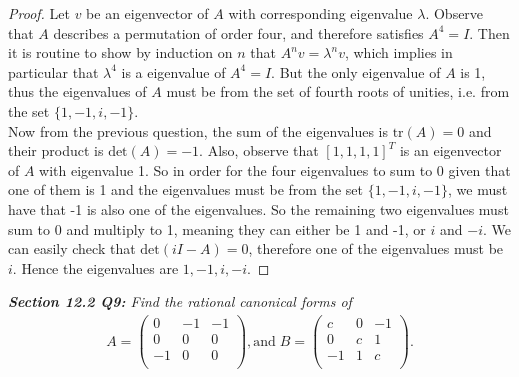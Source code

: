 \documentclass{article}
\begin{document}
  \begin{proof}
    Let $v$ be an eigenvector of $A$ with corresponding eigenvalue
    $\lambda$. Observe that $A$ describes a permutation of order four, and
    therefore satisfies $A^4=I$. Then it is routine to show by induction on
    $n$ that $A^nv=\lambda^nv$, which implies in particular that
    $\lambda^4$ is a eigenvalue of $A^4=I$. But the only eigenvalue of $A$
    is 1, thus the eigenvalues of $A$ must be from the set of fourth roots
    of unities, i.e. from the set $\{1,-1,i,-1\}$. \\

    Now from the previous question, the sum of the eigenvalues is
    $\text{tr}(A)=0$ and their product is $\text{det}(A)=-1$. Also,
    observe that $[1,1,1,1]^T$ is an eigenvector of $A$ with eigenvalue 1.
    So in order for the four eigenvalues to sum to 0 given that one of them
    is 1 and the eigenvalues must be from the set $\{1,-1,i,-1\}$, we must
    have that -1 is also one of the eigenvalues. So the remaining two
    eigenvalues must sum to 0 and multiply to 1, meaning they can either
    be 1 and -1, or $i$ and $-i$. We can easily check that
    $\text{det}(iI-A)=0$, therefore one of the eigenvalues must be $i$.
    Hence the eigenvalues are $1,-1,i,-i$.
  \end{proof}

\it \textbf{Section 12.2 Q9:} Find the rational canonical forms of
  \begin{align*}
    A=\begin{pmatrix}
      0&-1&-1\\
      0&0&0\\
      -1&0&0\\
    \end{pmatrix}, \text{and}\;
    B=\begin{pmatrix}
      c&0&-1\\
      0&c&1\\
      -1&1&c\\
    \end{pmatrix}.
  \end{align*}
\end{document}
